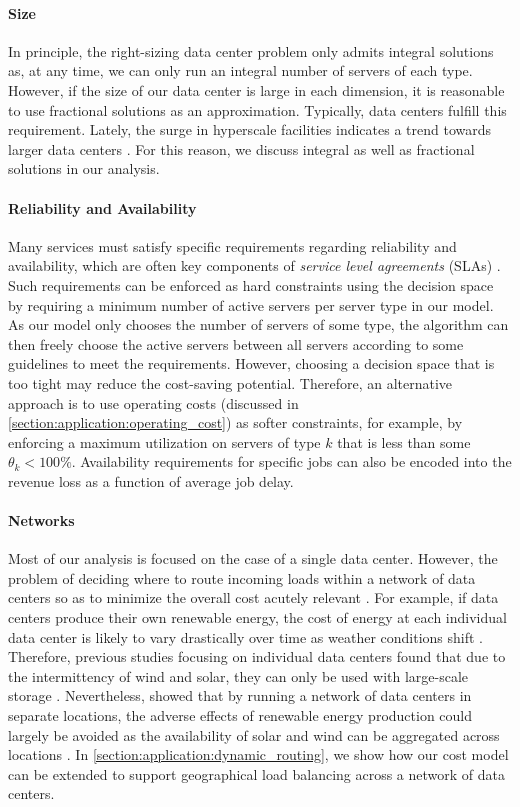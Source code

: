 \paragraph{Size} In principle, the right-sizing data center problem only admits integral solutions as, at any time, we can only run an integral number of servers of each type. However, if the size of our data center is large in each dimension, it is reasonable to use fractional solutions as an approximation. Typically, data centers fulfill this requirement. Lately, the surge in hyperscale facilities indicates a trend towards larger data centers \cite{Jones2018}. For this reason, we discuss integral as well as fractional solutions in our analysis.

\paragraph{Reliability and Availability} Many services must satisfy specific requirements regarding reliability and availability, which are often key components of \emph{service level agreements} (SLAs) \cite{Lin2011}. Such requirements can be enforced as hard constraints using the decision space by requiring a minimum number of active servers per server type in our model. As our model only chooses the number of servers of some type, the algorithm can then freely choose the active servers between all servers according to some guidelines to meet the requirements. However, choosing a decision space that is too tight may reduce the cost-saving potential. Therefore, an alternative approach is to use operating costs (discussed in \autoref{section:application:operating_cost}) as softer constraints, for example, by enforcing a maximum utilization on servers of type $k$ that is less than some $\theta_k < 100\%$. Availability requirements for specific jobs can also be encoded into the revenue loss as a function of average job delay.

\paragraph{Networks} Most of our analysis is focused on the case of a single data center. However, the problem of deciding where to route incoming loads within a network of data centers so as to minimize the overall cost acutely relevant \cite{Miller2021}. For example, if data centers produce their own renewable energy, the cost of energy at each individual data center is likely to vary drastically over time as weather conditions shift \cite{Lin2012}. Therefore, previous studies focusing on individual data centers found that due to the intermittency of wind and solar, they can only be used with large-scale storage \cite{Gmach2010, Gmach2010_2}. Nevertheless, \citeauthor*{Lin2012} showed that by running a network of data centers in separate locations, the adverse effects of renewable energy production could largely be avoided as the availability of solar and wind can be aggregated across locations \cite{Lin2012}. In \autoref{section:application:dynamic_routing}, we show how our cost model can be extended to support geographical load balancing across a network of data centers.

